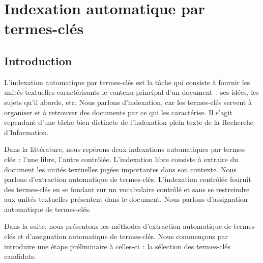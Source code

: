 \chapter{Indexation automatique par termes-clés}
\label{part:main-state_of_the_art}
  \section{Introduction}
  \label{sec:main-state_of_the_art-introduction}
    L'indexation automatique par termes-clés est la tâche qui consiste à fournir
    les unités textuelles caractérisants le contenu principal d'un document~:
    ses idées, les sujets qu'il aborde, etc. Nous parlons d'indexation, car les
    termes-clés servent à organiser et à retrouver des documents par ce qui les
    caractérise. Il s'agit cependant d'une tâche bien distincte de l'indexation
    plein texte de la Recherche d'Information. 

    Dans la littérature, nous repérons deux indexations automatiques par
    termes-clés~: l'une libre, l'autre contrôlée. L'indexation libre consiste à
    extraire du document les unités textuelles jugées importantes dans son
    contexte. Nous parlons d'extraction automatique de termes-clés. L'indexation
    contrôlée fournit des termes-clés en se fondant sur un vocabulaire contrôlé
    et sans se restreindre aux unités textuelles présentent dans le document.
    Nous parlons d'assignation automatique de termes-clés.

    Dans la suite, nous présentons les méthodes d'extraction
    automatique de termes-clés et d'assignation automatique de termes-clés. Nous
    commençons par introduire une étape préliminaire à celles-ci~: la sélection
    des termes-clés candidats.


